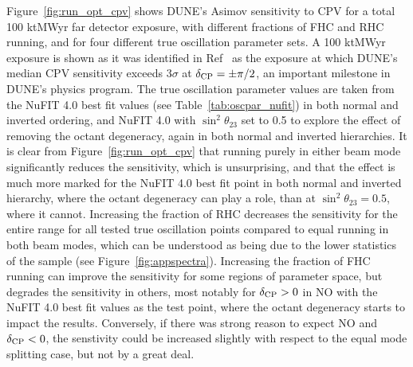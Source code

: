 Figure~\ref{fig:run_opt_cpv} shows DUNE's Asimov sensitivity to CPV for a total 100 ktMWyr far detector exposure, with different fractions of FHC and RHC running, and for four different true oscillation parameter sets. A 100 ktMWyr exposure is shown as it was identified in Ref~\cite{Abi:2020qib} as the exposure at which DUNE's median CPV sensitivity exceeds 3$\sigma$ at $\delta_{\rm CP} = \pm\pi/2$, an important milestone in DUNE's physics program. The true oscillation parameter values are taken from the NuFIT 4.0 best fit values (see Table~\ref{tab:oscpar_nufit}) in both normal and inverted ordering, and NuFIT 4.0 with $\sin^{2}\theta_{23}$ set to 0.5 to explore the effect of removing the octant degeneracy, again in both normal and inverted hierarchies. It is clear from Figure~\ref{fig:run_opt_cpv} that running purely in either beam mode significantly reduces the sensitivity, which is unsurprising, and that the effect is much more marked for the NuFIT 4.0 best fit point in both normal and inverted hierarchy, where the octant degeneracy can play a role, than at $\sin^{2}\theta_{23} = 0.5$, where it cannot. Increasing the fraction of RHC decreases the sensitivity for the entire \deltacp range for all tested true oscillation points compared to equal running in both beam modes, which can be understood as being due to the lower statistics of the \anue sample (see Figure~\ref{fig:appspectra}). Increasing the fraction of FHC running can improve the sensitivity for some regions of parameter space, but degrades the sensitivity in others, most notably for $\delta_{\rm CP} > 0$ in NO with the NuFIT 4.0 best fit values as the test point, where the octant degeneracy starts to impact the results. Conversely, if there was strong reason to expect NO and $\delta_{\rm CP} < 0$, the senstivity could be increased slightly with respect to the equal mode splitting case, but not by a great deal.

